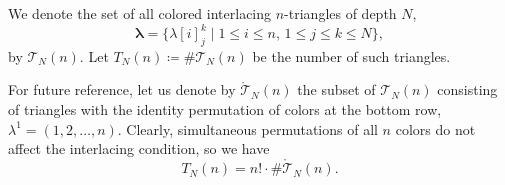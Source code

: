 \documentclass[pdftex]{sigma}
\numberwithin{equation}{section}
\theoremstyle{definition}
\begin{document}
	We denote the set of all colored interlacing $n$-triangles of depth $N$,
	\[
		\boldsymbol\lambda=\bigl\{\lambda[i]^{k}_{j}\mid 1\le i\le n,\, 1\le
		j\le k\le N\bigr\},
	\]
	by
	$\mathcal{T}_N(n)$.
	Let $T_N(n)\coloneqq\#\mathcal{T}_N(n)$ be the number of such triangles.

	
For future reference, let us denote by $\mathring{\mathcal{T}}_N(n)$ the subset
of $\mathcal{T}_N(n)$ consisting of triangles with the identity permutation of
colors at the bottom row, $\lambda^1 = (1,2,\dots,n)$.
Clearly, simultaneous permutations of all $n$ colors do not affect the
interlacing condition, so we have
\begin{equation}
	\label{eq:fixed_bottom_row} T_N(n) = n!
                                        \cdot \# \mathring{\mathcal{T}}_N(n).
\end{equation}
\end{document}
